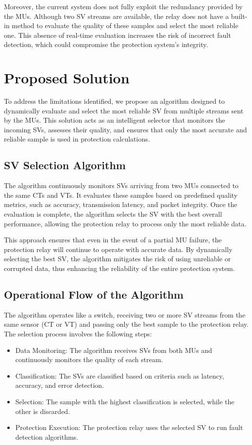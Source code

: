 Moreover, the current system does not fully exploit the redundancy provided by the MUs. Although two SV streams are available, the relay does not have a built-in method to evaluate the quality of these samples and select the most reliable one. This absence of real-time evaluation increases the risk of incorrect fault detection, which could compromise the protection system's integrity.

\section{Proposed Solution}

To address the limitations identified, we propose an algorithm designed to dynamically evaluate and select the most reliable SV from multiple streams sent by the MUs. This solution acts as an intelligent selector that monitors the incoming SVs, assesses their quality, and ensures that only the most accurate and reliable sample is used in protection calculations.

\subsection{SV Selection Algorithm}

The algorithm continuously monitors SVs arriving from two MUs connected to the same CTs and VTs. It evaluates these samples based on predefined quality metrics, such as accuracy, transmission latency, and packet integrity. Once the evaluation is complete, the algorithm selects the SV with the best overall performance, allowing the protection relay to process only the most reliable data.

This approach ensures that even in the event of a partial MU failure, the protection relay will continue to operate with accurate data. By dynamically selecting the best SV, the algorithm mitigates the risk of using unreliable or corrupted data, thus enhancing the reliability of the entire protection system.

\subsection{Operational Flow of the Algorithm}

The algorithm operates like a switch, receiving two or more SV streams from the same sensor (CT or VT) and passing only the best sample to the protection relay. The selection process involves the following steps:
\begin{itemize}
	\item Data Monitoring: The algorithm receives SVs from both MUs and continuously monitors the quality of each stream.
	\item Classification: The SVs are classified based on criteria such as latency, accuracy, and error detection.
	\item Selection: The sample with the highest classification is selected, while the other is discarded.
	\item Protection Execution: The protection relay uses the selected SV to run fault detection algorithms.
\end{itemize}

